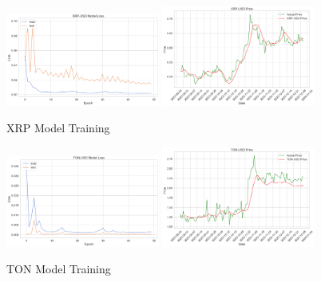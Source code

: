\documentclass{ledger}
\begin{document}
\begin{figure}[htbp]
    \centering
    \includegraphics[width=0.45\textwidth]{code/price-prediction/lstm/images/xrp_usd_loss.png} %
    \hspace{0.05\textwidth} %
    \includegraphics[width=0.45\textwidth]{code/price-prediction/lstm/images/xrp_usd_price.png} %
    \caption{XRP Model Training}
    \label{fig:side_by_side}
\end{figure}

\begin{figure}[htbp]
    \centering
    \includegraphics[width=0.45\textwidth]{code/price-prediction/lstm/images/ton_usd_loss.png} %
    \hspace{0.05\textwidth} %
    \includegraphics[width=0.45\textwidth]{code/price-prediction/lstm/images/ton_usd_price.png} %
    \caption{TON Model Training}
    \label{fig:side_by_side}
\end{figure}
\end{document}
